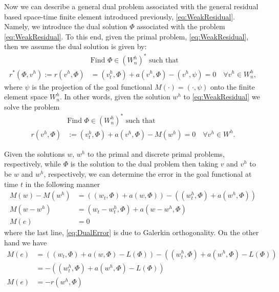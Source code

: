Now we can describe a general dual problem associated with the general residual
based space-time finite element introduced previously, \eqref{eq:WeakResidual}.
Namely, we introduce the dual solution $\Phi$ associated with the problem
\eqref{eq:WeakResidual}. To this end, given the primal problem,
\eqref{eq:WeakResidual}, then we assume the dual solution is given by:
\begin{equation*}
    \begin{split}
        &\text{Find } \Phi \in (W^h_n)^* \text{ such that} \\
        r^*(\Phi, v^h) := r(v^h, \Phi) &= (v^h_t, \Phi) + a(v^h, \Phi)
            - (v^h, \psi) = 0 \quad \forall v^h \in W^h_n,
    \end{split}
\end{equation*}
where $\psi$ is the projection of the goal functional $M(\cdot) = (\cdot, \psi)$
onto the finite element space $W^h_n$. In other words, given the solution $w^h$
to \eqref{eq:WeakResidual} we solve the problem
\begin{equation}
    \begin{split}
        &\text{Find } \Phi \in (W^h_n)^* \text{ such that} \\
        r(v^h, \Phi) &:= (v^h_t, \Phi) + a(v^h, \Phi) - M(w^h) = 0
                       \quad \forall v^h \in W^h.
    \end{split}
    \label{eq:Dual}
\end{equation}

Given the solutions $w,\, w^h$ to the primal and discrete primal problems,
respectively, while $\Phi$ is the solution to the dual problem then
taking $v$ and $v^h$ to be $w$ and $w^h$, respectively, we can determine the
error in the goal functional at time $t$ in the following manner
\begin{align}
    M(w) - M(w^h) &= \left((w_t, \Phi) + a(w, \Phi)\right)
                      - \left( (w^h_t, \Phi) + a(w^h, \Phi) \right) \nonumber \\
    M(w - w^h) &= (w_t - w^h_t, \Phi) + a(w - w^h, \Phi) \nonumber \\
    M(e) &= 0 \label{eq:DualError}
\end{align}
where the last line, \eqref{eq:DualError} is due to Galerkin orthogonality. On
the other hand we have
\begin{align}
    M(e) & = \left((w_t, \Phi) + a(w, \Phi) - L(\Phi)\right)
             - \left((w^h_t, \Phi) + a(w^h, \Phi) - L(\Phi) \right) \nonumber \\
    &= -\left((w^h_t, \Phi) + a(w^h, \Phi) - L(\Phi) \right) \nonumber \\
    M(e) &= -r(w^h, \Phi) \label{eq:ErrorRepresentation} \\
\end{align}

